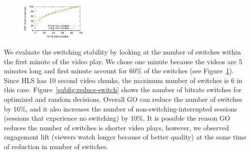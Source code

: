 \begin{figure}[h!]
\centering
 \includegraphics[width=0.3\textwidth] {figures/switch-time-dist.pdf}
\label{fig:switch-time-dist}
\end{figure}


We evaluate the switching stability by looking at the number of switches within the first minute of the video play.
We chose one minute because the videos are 5 minutes long and first minute account for 60\% of the switches (see Figure~\ref{fig:switch-time-dist}). 
Since HLS has 10 second video chunks, the maximum number of switches is 6 in this case.
Figure~\ref{subfig:reduce-switch} shows the number of bitrate switches for optimized and random decisions. 
Overall GO can reduce the number of switches by 16\%, and it also increases the number of non-switching-interrupted sessions 
(sessions that experience no switching) by 10\%.
It is possible the reason GO reduces the number of switches is shorter video plays, however, we observed engagement lift
(viewers watch longer because of better quality) at the same time of reduction in number of switches.



\begin{figure}[h!]
\centering
{}
\hspace{-0.6cm}
\label{fig:bitrate-stability}
\end{figure}


